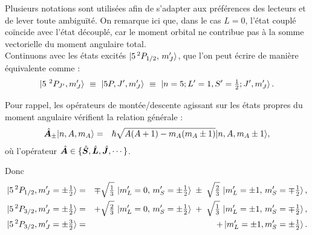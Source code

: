 Plusieurs notations sont utilisées afin de s’adapter aux préférences des lecteurs et de lever toute ambiguïté.
On remarque ici que, dans le cas $L = 0$, l’état couplé coïncide avec l’état découplé, car le moment orbital ne contribue pas à la somme vectorielle du moment angulaire total.\\

Continuons avec les états excités $\ket{5\,^2P_{1/2},\,m_J'}$, que l’on peut écrire de manière équivalente comme :
\begin{eqnarray}
	\ket{ 5{~}^2P_{J'} , m_J'  } ~\equiv~ \ket{ 5P , J'  , m_J' }  ~\equiv~ \ket{n=5 ; L'=1 , S'=\tfrac12 ;  J'  , m_J'  }.
\end{eqnarray}

Pour rappel, les opérateurs de montée/descente agissant sur les états propres du moment angulaire vérifient la relation générale :
\begin{eqnarray}
	\hat{\bm{A}}_\pm \vert n , A , m	_A \rangle & = & \hbar \sqrt{A(A+1) - m_A(m_A\pm 1 ) } \vert n , A , m	_A \pm 1  \rangle,
\end{eqnarray}
où l'opérateur $\hat{\bm{A}} \in \{ \hat{\bm{S}} , \hat{\bm{L}} , \hat{\bm{J}} , \cdots \}$.

Donc 
\begin{eqnarray}
	\ket{5\,^2P_{1/2},m_J' = \pm\tfrac12} &=& \mp\sqrt{\tfrac{1}{3}}\,\ket{ m_L'=0,\,m_S'=\pm\tfrac12} \;\pm\;\sqrt{\tfrac{2}{3}}\,\ket{m_L'=\pm 1,\,m_S'=\mp\tfrac12} \label{chap7:dipolaire:eq:5P_decomposed_1}   ,\\ 
	\ket{5\,^2P_{3/2},m_J' = \pm\tfrac12} &=& +\sqrt{\tfrac{2}{3}}\,\ket{m_L'=0,\,m_S'=\pm\tfrac12} \;+\;\sqrt{\tfrac{1}{3}}\,\ket{ m_L'=\pm 1,\,m_S'=\mp\tfrac12} \label{chap7:dipolaire:eq:5P_decomposed_2} ,\\
	\ket{5\,^2P_{3/2},m_J' = \pm\tfrac32} &= & +\ket{m_L'=\pm 1 , m_S' = \pm \tfrac12} \label{chap7:dipolaire:eq:5P_decomposed_3} .  
\end{eqnarray}
 
